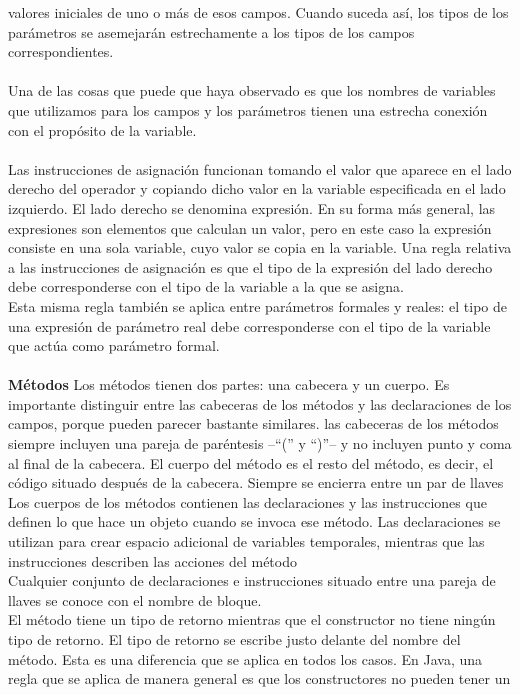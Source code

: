 \documentclass[11pt,a4paper]{article}
\begin{document}
	valores iniciales de uno o más de esos campos. Cuando suceda así, los tipos de los parámetros se
	asemejarán estrechamente a los tipos de los campos correspondientes.\\
	\\
	Una de las cosas que puede que haya observado es que los nombres de variables que utilizamos
	para los campos y los parámetros tienen una estrecha conexión con el propósito de la variable.\\
	\\
	Las instrucciones de asignación funcionan
	tomando el valor que aparece en el lado derecho del operador y copiando dicho valor en la variable
	especificada en el lado izquierdo. El lado
	derecho se denomina expresión. En su forma más general, las expresiones son elementos que calculan
	un valor, pero en este caso la expresión consiste en una sola variable, cuyo valor se copia
	en la variable. Una regla relativa a las instrucciones de asignación es que el tipo de la expresión del lado derecho
	debe corresponderse con el tipo de la variable a la que se asigna.\\Esta misma regla también se aplica entre parámetros formales y reales:
	el tipo de una expresión de parámetro real debe corresponderse con el tipo de la variable que actúa
	como parámetro formal.\\
	\\
	\textbf{Métodos} Los métodos tienen dos partes: una cabecera y un cuerpo. Es importante distinguir entre las cabeceras de los métodos y las declaraciones de los campos, porque
	pueden parecer bastante similares. las cabeceras de los métodos siempre incluyen una pareja de paréntesis –“(” y “)”– y no incluyen
	punto y coma al final de la cabecera. El cuerpo del método es el resto del método, es decir, el código situado después de la cabecera.
	Siempre se encierra entre un par de llaves Los cuerpos de los métodos contienen las
	declaraciones y las instrucciones que definen lo que hace un objeto cuando se invoca ese método.
	Las declaraciones se utilizan para crear espacio adicional de variables temporales, mientras que las
	instrucciones describen las acciones del método\\
	Cualquier conjunto de declaraciones e instrucciones situado entre una pareja de llaves se conoce
	con el nombre de bloque.\\
	El método tiene un tipo de retorno mientras que el constructor no tiene ningún tipo de
	retorno. El tipo de retorno se escribe justo delante del nombre del método. Esta es una diferencia
	que se aplica en todos los casos. En Java, una regla que se aplica de manera general es que los constructores no pueden tener un
\end{document}
